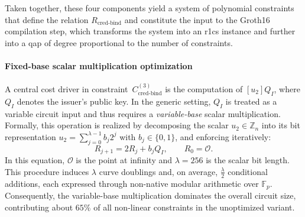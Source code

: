 \medskip
Taken together, these four components yield a system of polynomial constraints that define the relation $R_{\text{cred-bind}}$ and constitute the input to the Groth16 compilation step, which transforms the system into an \acrshort{r1cs} instance and further into a \acrshort{qap} of degree proportional to the number of constraints.

\paragraph{Fixed-base scalar multiplication optimization}
A central cost driver in constraint~$C_{\text{cred-bind}}^{(3)}$ is the computation of $[u_2]Q_I$, where $Q_I$ denotes the issuer’s public key. In the generic setting, $Q_I$ is treated as a variable circuit input and thus requires a \emph{variable-base} scalar multiplication. Formally, this operation is realized by decomposing the scalar $u_2 \in \mathbb{Z}_n$ into its bit representation $u_2 = \sum_{j=0}^{\lambda-1} b_j 2^j$ with $b_j \in \{0,1\}$, and enforcing iteratively:
\[
R_{j+1} = 2R_j + b_j Q_I, \qquad R_0 = \mathcal{O}.
\]
In this equation, $\mathcal{O}$ is the point at infinity and $\lambda=256$ is the scalar bit length. This procedure induces $\lambda$ curve doublings and, on average, $\frac{\lambda}{2}$ conditional additions, each expressed through non-native modular arithmetic over $\mathbb{F}_{p}$. Consequently, the variable-base multiplication dominates the overall circuit size, contributing about $65\%$ of all non-linear constraints in the unoptimized variant.

